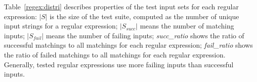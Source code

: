 Table~\ref{regex:distri} describes properties of the test input sets for each regular expression: \emph{$\lvert S \rvert$} is the size of the test suite, computed as the number of unique input strings for a regular expression; $\lvert S_{succ} \rvert$ means the number of matching inputs; $\lvert S_{fail} \rvert$ means the number of failing inputs; \emph{succ_ratio} shows the ratio of successful matchings to all matchings for each regular expression; \emph{fail_ratio} shows the ratio of failed matchings to all matchings for each regular expression. Generally, tested regular expressions use more failing inputs than successful inputs.  


